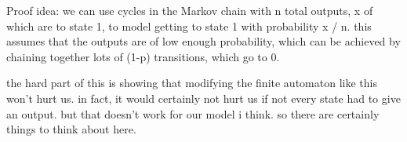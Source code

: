 \documentclass[11pt]{amsart}
\theoremstyle{definition}
\theoremstyle{remark}
\begin{document}
    Proof idea: we can use cycles in the Markov chain with n total outputs, x of which are to state 1, to model getting to state 1 with probability x / n. this assumes that the outputs are of low enough probability, which can be achieved by chaining together lots of (1-p) transitions, which go to 0.

    the hard part of this is showing that modifying the finite automaton like this won't hurt us. in fact, it would certainly not hurt us if not every state had to give an output. but that doesn't work for our model i think. so there are certainly things to think about here.



    
    
\end{document}
